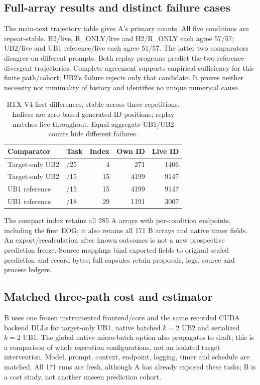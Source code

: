 \subsection{Full-array results and distinct failure cases}
The main-text trajectory table gives A's primary counts. All five conditions are repeat-stable. H2/live, R\_ONLY/live and H2/R\_ONLY each agree 57/57; UB2/live and UB1 reference/live each agree 51/57. The latter two comparators disagree on different prompts. Both replay programs predict the two reference-divergent trajectories. Complete agreement supports empirical sufficiency for this finite path/cohort; UB2's failure rejects only that candidate. It proves neither necessity nor minimality of history and identifies no unique numerical cause.

\begin{table}[t]
\caption{RTX V4 first differences, stable across three repetitions. Indices are zero-based generated-ID positions; replay matches live throughout. Equal aggregate UB1/UB2 counts hide different failures.}
\label{tab:rtxv4divergences}
\centering
\begin{tabular}{@{}llrrr@{}}
\toprule
Comparator & Task & Index & Own ID & Live ID \\
\midrule
Target-only UB2 & /25 & 4 & 271 & 1406 \\
Target-only UB2 & /15 & 15 & 4199 & 9147 \\
UB1 reference & /15 & 15 & 4199 & 9147 \\
UB1 reference & /18 & 29 & 1191 & 3007 \\
\bottomrule
\end{tabular}
\end{table}

The compact index retains all 285 A arrays with per-condition endpoints, including the first EOG; it also retains all 171 B arrays and native timer fields. An export/recalculation after known outcomes is not a new prospective prediction freeze. Source mappings bind exported fields to original sealed prediction and record bytes; full capsules retain proposals, logs, source and process ledgers.

\subsection{Matched three-path cost and estimator}
B uses one frozen instrumented frontend/core and the same recorded CUDA backend DLLs for target-only UB1, native batched $k=2$ UB2 and serialized $k=2$ UB1. The global native micro-batch option also propagates to draft; this is a comparison of whole execution configurations, not an isolated target intervention. Model, prompt, context, endpoint, logging, timer and schedule are matched. All 171 runs are fresh, although A has already exposed these tasks; B is a cost study, not another unseen prediction cohort.

